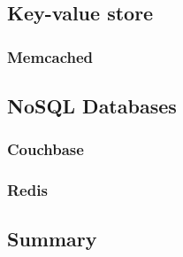 \subsection{Key-value store}

\subsubsection{Memcached}

\subsection{NoSQL Databases}

\subsubsection{Couchbase}

\subsubsection{Redis}

\subsection{Summary}





